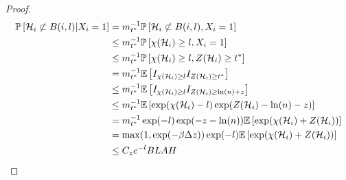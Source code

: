 \begin{proof}
	\begin{align}
		\mathbb{P}\left[\mathcal{H}_i \not\subset B(i, l) | X_i = 1\right] &= m_{t^*}^{-1} \mathbb{P}\left[\mathcal{H}_i \not\subset B(i, l), X_i = 1\right]\\
		&\leq m_{t^*}^{-1} \mathbb{P}\left[\chi(\mathcal{H}_i) \geq l, X_i = 1\right]\\
		&\leq m_{t^*}^{-1} \mathbb{P}\left[\chi(\mathcal{H}_i) \geq l, Z(\mathcal{H}_i) \geq t^*\right]\\
		&= m_{t^*}^{-1} \mathbb{E}\left[I_{\chi(\mathcal{H}_i) \geq l} I_{Z(\mathcal{H}_i) \geq t^*} \right]\\
		&\leq m_{t^*}^{-1} \mathbb{E}\left[I_{\chi(\mathcal{H}_i) \geq l} I_{Z(\mathcal{H}_i) \geq \ln(n) + z} \right]\\
		&\leq m_{t^*}^{-1} \mathbb{E}\left[\exp(\chi(\mathcal{H}_i) - l) \exp(Z(\mathcal{H}_i) - \ln(n) - z) \right]\\
		&= m_{t^*}^{-1} \exp(-l) \exp(-z - \ln(n)) \mathbb{E}\left[\exp(\chi(\mathcal{H}_i) + Z(\mathcal{H}_i)) \right]\\
		&= \max(1, \exp(- \beta \Delta z)) \exp(-l) \mathbb{E}\left[\exp(\chi(\mathcal{H}_i) + Z(\mathcal{H}_i)) \right]\\
		&\leq C_z e^{-l} BLAH
	\end{align}
\end{proof}

